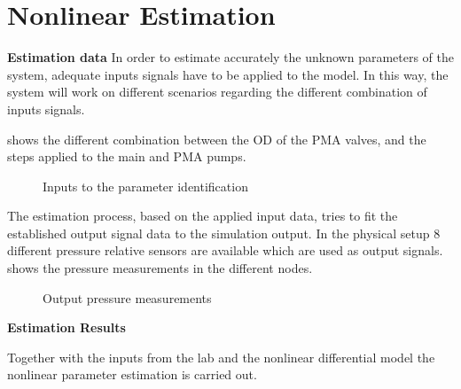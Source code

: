 \chapter{Nonlinear Estimation}
\label{NonLinResults}

\textbf{Estimation data}
In order to estimate accurately the unknown parameters of the system, adequate inputs signals have to be applied to the model. In this way, the system 
will work on different scenarios regarding the different combination of inputs signals. 

 shows the different combination between the OD of the PMA valves, and the steps applied to the main and PMA pumps. 

\begin{figure}[H]
\centering
\resizebox{0.75\linewidth}{!}{}
% 
\caption{Inputs to the parameter identification}
\label{systemdiagram}
\end{figure} 

The estimation process, based on the applied input data, tries to fit the established output signal data to the simulation output. In the physical setup $8$ 
different pressure relative sensors are available which are used as output signals.  shows the pressure measurements in the different 
nodes.

\begin{figure}[H]
\centering
\resizebox{0.75\linewidth}{!}{}
% 
\caption{Output pressure measurements}
\label{systemdiagram1}
\end{figure} 

\textbf{Estimation Results}

Together with the inputs from the lab and the nonlinear differential model the nonlinear parameter estimation is carried out. 

